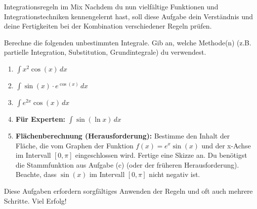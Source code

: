 \begin{aufgabenumgebung}{Integrationsregeln im Mix}
Nachdem du nun vielfältige Funktionen und Integrationstechniken kennengelernt hast, soll diese Aufgabe dein Verständnis und deine Fertigkeiten bei der Kombination verschiedener Regeln prüfen.

Berechne die folgenden unbestimmten Integrale. Gib an, welche Methode(n) (z.B. partielle Integration, Substitution, Grundintegrale) du verwendest.
\begin{enumerate}[label=(\alph*)]
    \item $\int x^2 \cos(x) \,dx$
    \item $\int \sin(x) \cdot e^{\cos(x)} \,dx$
    \item $\int e^{2x} \cos(x) \,dx$
    \item \textbf{Für Experten:} $\int \sin(\ln x) \,dx$
    \item \textbf{Flächenberechnung (Herausforderung):} Bestimme den Inhalt der Fläche, die vom Graphen der Funktion $f(x) = e^x \sin(x)$ und der x-Achse im Intervall $[0, \pi]$ eingeschlossen wird. Fertige eine Skizze an. Du benötigst die Stammfunktion aus Aufgabe (c) (oder der früheren Herausforderung). Beachte, dass $\sin(x)$ im Intervall $[0,\pi]$ nicht negativ ist.
\end{enumerate}
Diese Aufgaben erfordern sorgfältiges Anwenden der Regeln und oft auch mehrere Schritte. Viel Erfolg!
\end{aufgabenumgebung}


